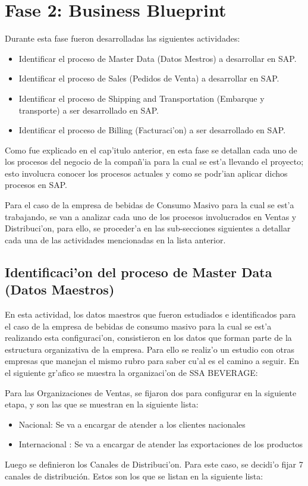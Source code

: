 \section{Fase 2: Business Blueprint}
	Durante esta fase fueron desarrolladas las siguientes actividades:
\begin{itemize}
\item Identificar el proceso de Master Data (Datos Mestros) a desarrollar en SAP.
\item Identificar el proceso de Sales (Pedidos de Venta) a desarrollar en SAP.
\item Identificar el proceso de Shipping and Transportation (Embarque y transporte) a ser desarrollado en SAP.
\item Identificar el proceso de Billing (Facturaci'on) a ser desarrollado en SAP.
\end{itemize}

	Como fue explicado en el cap'itulo anterior, en esta fase se detallan cada uno de los procesos del negocio de la compa\~n'ia para la cual se est'a llevando el proyecto; esto involucra conocer los procesos actuales y como se podr'ian aplicar dichos procesos en SAP. 
	
	Para el caso de la empresa de bebidas de Consumo Masivo para la cual se est'a trabajando, se van a analizar cada uno de los procesos involucrados en Ventas y Distribuci'on, para ello, se proceder'a en las sub-secciones siguientes a detallar cada una de las actividades mencionadas en la lista anterior.
	
\subsection{Identificaci'on del proceso de Master Data (Datos Maestros)}
	En esta actividad, los datos maestros que fueron estudiados e identificados para el caso de la empresa de bebidas de consumo masivo para la cual se est'a realizando esta configuraci'on, consistieron en los datos que forman parte de la estructura organizativa de la empresa. Para ello se realiz'o un estudio con otras empresas que manejan el mismo rubro para saber cu'al es el camino a seguir. En el siguiente gr'afico se muestra la organizaci'on de SSA BEVERAGE:

	Para las Organizaciones de Ventas, se fijaron dos para configurar en la siguiente etapa, y son las que se muestran en la siguiente lista:

\begin{itemize}

\item Nacional: Se va a encargar de atender a los clientes nacionales
\item Internacional : Se va a encargar de atender las exportaciones de los productos
\end{itemize}
	Luego se definieron los Canales de Distribuci'on. Para este caso, se decidi'o fijar 7 canales de distribución. Estos son los que se listan en la siguiente lista:

